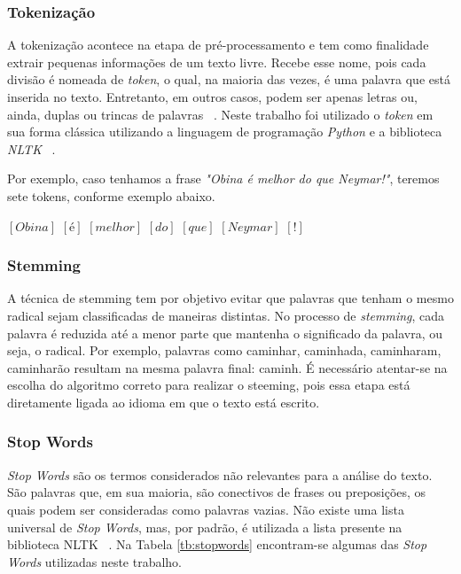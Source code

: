         \subsubsection{Tokenização}

              A tokenização acontece na etapa de pré-processamento e tem como finalidade extrair pequenas informações de um texto livre. Recebe esse nome, pois cada divisão é nomeada de \textit{token}, 
              o qual, na maioria das vezes, é uma palavra que está inserida no texto. Entretanto, em outros casos, podem ser apenas letras ou, ainda, duplas ou trincas de palavras ~\cite{mcnamee2004character}. Neste trabalho foi utilizado o \textit{token} em sua forma clássica utilizando 
            a linguagem de programação \textit{Python} e a biblioteca \textit{NLTK} ~\cite{bird2004nltk}.

              Por exemplo, caso tenhamos a frase \textit{"Obina é melhor do que Neymar!"}, teremos sete tokens, conforme exemplo abaixo.

                    $[Obina]$  $[é]$  $[melhor]$  $[do]$  $[que]$  $[Neymar]$  $[!]$
        \subsubsection{Stemming}

          A técnica de stemming tem por objetivo evitar que palavras que tenham o mesmo radical sejam classificadas de maneiras distintas. No processo de \textit{stemming}, 
          cada palavra é reduzida até a menor parte que mantenha o significado da palavra, ou seja, o radical. Por exemplo, palavras como caminhar, caminhada, caminharam, 
          caminharão resultam na mesma palavra final: caminh.
          É necessário atentar-se na escolha do algoritmo correto para realizar o steeming, pois essa etapa está diretamente ligada ao idioma em que o texto está escrito.
        \subsubsection{Stop Words}

            \textit{Stop Words} são os termos considerados não relevantes para a análise do texto. São palavras que, em sua maioria, são conectivos de frases ou preposições, 
            os quais podem ser consideradas como palavras vazias. Não existe uma lista universal de \textit{Stop Words}, mas, por padrão, é 
            utilizada a lista presente na biblioteca NLTK ~\cite{bird2004nltk}. Na Tabela \ref{tb:stopwords} encontram-se algumas das \textit{Stop Words} utilizadas neste trabalho.

